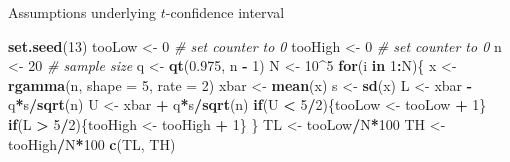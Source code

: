 \documentclass[
  ignorenonframetext,
]{beamer}
\newenvironment{Shaded}{\begin{snugshade}}{\end{snugshade}}
\newcommand{\AttributeTok}[1]{\textcolor[rgb]{0.13,0.29,0.53}{#1}}
\newcommand{\CommentTok}[1]{\textcolor[rgb]{0.56,0.35,0.01}{\textit{#1}}}
\newcommand{\ControlFlowTok}[1]{\textcolor[rgb]{0.13,0.29,0.53}{\textbf{#1}}}
\newcommand{\DecValTok}[1]{\textcolor[rgb]{0.00,0.00,0.81}{#1}}
\newcommand{\FloatTok}[1]{\textcolor[rgb]{0.00,0.00,0.81}{#1}}
\newcommand{\FunctionTok}[1]{\textcolor[rgb]{0.13,0.29,0.53}{\textbf{#1}}}
\newcommand{\NormalTok}[1]{#1}
\newcommand{\OtherTok}[1]{\textcolor[rgb]{0.56,0.35,0.01}{#1}}
\newcommand{\SpecialCharTok}[1]{\textcolor[rgb]{0.81,0.36,0.00}{\textbf{#1}}}
\begin{document}
\begin{frame}[fragile]{Assumptions underlying \(t\)-confidence interval}
\protect\hypertarget{assumptions-underlying-t-confidence-interval-3}{}
\tiny

\begin{Shaded}
\begin{Highlighting}[]
\FunctionTok{set.seed}\NormalTok{(}\DecValTok{13}\NormalTok{)}
\NormalTok{tooLow }\OtherTok{\textless{}{-}} \DecValTok{0}       \CommentTok{\# set counter to 0}
\NormalTok{tooHigh }\OtherTok{\textless{}{-}} \DecValTok{0}      \CommentTok{\# set counter to 0}
\NormalTok{n }\OtherTok{\textless{}{-}} \DecValTok{20}           \CommentTok{\# sample size}
\NormalTok{q }\OtherTok{\textless{}{-}} \FunctionTok{qt}\NormalTok{(}\FloatTok{0.975}\NormalTok{, n }\SpecialCharTok{{-}} \DecValTok{1}\NormalTok{)}
\NormalTok{N }\OtherTok{\textless{}{-}} \DecValTok{10}\SpecialCharTok{\^{}}\DecValTok{5}
\ControlFlowTok{for}\NormalTok{(i }\ControlFlowTok{in} \DecValTok{1}\SpecialCharTok{:}\NormalTok{N)\{}
\NormalTok{  x }\OtherTok{\textless{}{-}} \FunctionTok{rgamma}\NormalTok{(n, }\AttributeTok{shape =} \DecValTok{5}\NormalTok{, }\AttributeTok{rate =} \DecValTok{2}\NormalTok{)}
\NormalTok{  xbar }\OtherTok{\textless{}{-}} \FunctionTok{mean}\NormalTok{(x)}
\NormalTok{  s }\OtherTok{\textless{}{-}} \FunctionTok{sd}\NormalTok{(x)}
\NormalTok{  L }\OtherTok{\textless{}{-}}\NormalTok{ xbar }\SpecialCharTok{{-}}\NormalTok{ q}\SpecialCharTok{*}\NormalTok{s}\SpecialCharTok{/}\FunctionTok{sqrt}\NormalTok{(n)}
\NormalTok{  U }\OtherTok{\textless{}{-}}\NormalTok{ xbar }\SpecialCharTok{+}\NormalTok{ q}\SpecialCharTok{*}\NormalTok{s}\SpecialCharTok{/}\FunctionTok{sqrt}\NormalTok{(n)}
  \ControlFlowTok{if}\NormalTok{(U }\SpecialCharTok{\textless{}} \DecValTok{5}\SpecialCharTok{/}\DecValTok{2}\NormalTok{)\{tooLow }\OtherTok{\textless{}{-}}\NormalTok{ tooLow }\SpecialCharTok{+} \DecValTok{1}\NormalTok{\}}
  \ControlFlowTok{if}\NormalTok{(L }\SpecialCharTok{\textgreater{}} \DecValTok{5}\SpecialCharTok{/}\DecValTok{2}\NormalTok{)\{tooHigh }\OtherTok{\textless{}{-}}\NormalTok{ tooHigh }\SpecialCharTok{+} \DecValTok{1}\NormalTok{\}}
\NormalTok{\}}
\NormalTok{TL }\OtherTok{\textless{}{-}}\NormalTok{ tooLow}\SpecialCharTok{/}\NormalTok{N}\SpecialCharTok{*}\DecValTok{100}
\NormalTok{TH }\OtherTok{\textless{}{-}}\NormalTok{ tooHigh}\SpecialCharTok{/}\NormalTok{N}\SpecialCharTok{*}\DecValTok{100}
\FunctionTok{c}\NormalTok{(TL, TH)}
\end{Highlighting}
\end{Shaded}


\end{frame}
\end{document}
